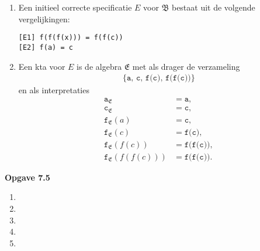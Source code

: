 \documentclass[a4paper,11pt]{article}
\begin{document}
\begin{enumerate}

\item %

Een initieel correcte specificatie $E$ voor $\mathfrak{B}$ bestaat uit de
volgende vergelijkingen:
\begin{verbatim}
[E1] f(f(f(x))) = f(f(c))
[E2] f(a) = c
\end{verbatim}

\item %

Een kta voor $E$ is de algebra $\mathfrak{E}$ met als drager de verzameling
\begin{align*}
\{\texttt{a}, \, \texttt{c}, \, \texttt{f(c)}, \, \texttt{f(f(c))}\}
\end{align*}
en als interpretaties
\begin{align*}
\texttt{a}_{\mathfrak{E}}          &= \texttt{a}, \\
\texttt{c}_{\mathfrak{E}}          &= \texttt{c}, \\
\texttt{f}_{\mathfrak{E}}(a)       &= \texttt{c}, \\
\texttt{f}_{\mathfrak{E}}(c)       &= \texttt{f(c)}, \\
\texttt{f}_{\mathfrak{E}}(f(c))    &= \texttt{f(f(c))}, \\
\texttt{f}_{\mathfrak{E}}(f(f(c))) &= \texttt{f(f(c))}.
\end{align*}

\end{enumerate}


{\bf Opgave 7.5}

\begin{enumerate}

\item %

\item %

\item %

\item %

\item %

\end{enumerate}
\end{document}
